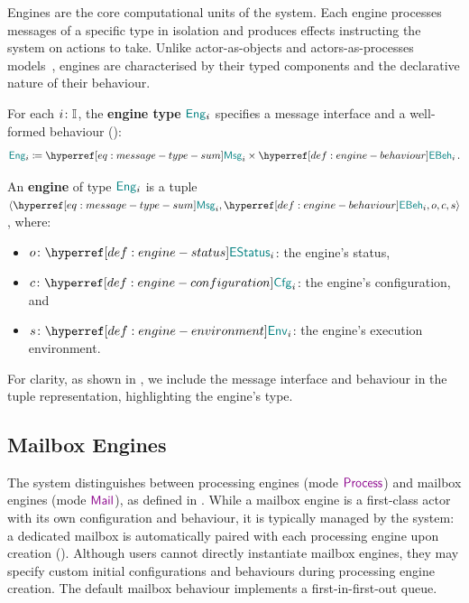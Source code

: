 \documentclass[
  a4paper,        %
  techreport,     %
]{art}
\begin{document}
Engines are the core computational units of the system. Each engine processes
messages of a specific type in isolation and produces effects instructing the
system on actions to take. Unlike actor-as-objects and actors-as-processes
models~\cite{taxonomy-of-actor-models}, engines are characterised by their
typed components and the declarative nature of their behaviour.

\begin{definition}\label{def:engine-type}%
For each $i\colon\mathbb{I}$, the \textbf{engine type} ${\color{teal}\mathsf{\mathsf{Eng}}}_{i}$
specifies a message interface and a well-formed behaviour
():
  \begin{equation}\label{eq:engine-type-definition}
    \begin{aligned}
    \defequal{
     \enginetype{i}
    }{
      \msgtype{i}
      \times \behaviourtype{i}
    }\,.
    \end{aligned}
  \end{equation}
\end{definition}

\begin{definition}\label{def:engine}%
An \textbf{engine} of type ${\color{teal}\mathsf{\mathsf{Eng}}}_{i}$ is a tuple
$\engineval{\msgtype{i}}{\behaviourtype{i}}{o}{c}{s}$, where:
\begin{itemize}
  \item $\typing{o}{\EngineStatus{i}}$: the engine's status,
  \item $\typing{c}{\configtype{i}}$: the engine's configuration, and
  \item $\typing{s}{\envtype{i}}$: the engine's execution environment.
\end{itemize}
\end{definition}

For clarity, as shown in , we include the message interface
and behaviour in the tuple representation, highlighting the engine's type.

\subsection{Mailbox Engines}\label{sec:mailbox-engines}

The system distinguishes between processing engines (mode $\process$) and
mailbox engines (mode $\mail$), as defined in . While
a mailbox engine is a first-class actor with its own configuration and
behaviour, it is typically managed by the system: a dedicated mailbox is
automatically paired with each processing engine upon creation
(). Although users cannot directly instantiate
mailbox engines, they may specify custom initial configurations and
behaviours during processing engine creation. The default mailbox behaviour
implements a first-in-first-out queue.
\end{document}
